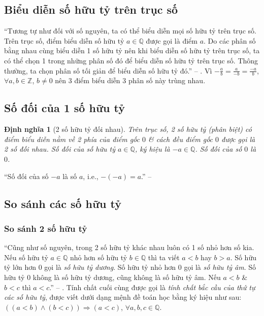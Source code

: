 \documentclass[oneside]{book}
\numberwithin{equation}{section}
\newtheorem{dinhnghia}{Định nghĩa}[section]
\begin{document}
\subsection{Biểu diễn số hữu tỷ trên trục số}
``Tương tự như đối với số nguyên, ta có thể biểu diễn mọi số hữu tỷ trên trục số. Trên trục số, điểm biểu diễn số hữu tỷ $a\in\mathbb{Q}$ được gọi là điểm $a$. Do các phân số bằng nhau cùng biểu diễn 1 số hữu tỷ nên khi biểu diễn số hữu tỷ trên trục số, ta có thể chọn 1 trong những phân số đó để biểu diễn số hữu tỷ trên trục số. Thông thường, ta chọn phân số tối giản để biểu diễn số hữu tỷ đó.'' -- \cite[p. 6]{SGK_Toan_7_Canh_Dieu_tap_1}. Vì $-\frac{a}{b} = \frac{a}{-b} = \frac{-a}{b}$, $\forall a,b\in\mathbb{Z}$, $b\ne 0$ nên 3 điểm biểu diễn 3 phân số này trùng nhau.

\subsection{Số đối của 1 số hữu tỷ}

\begin{dinhnghia}[2 số hữu tỷ đối nhau]
	Trên trục số, 2 số hữu tỷ (phân biệt) có điểm biểu diễn nằm về 2 phía của điểm gốc $0$ \& cách đều điểm gốc $0$ được gọi là \emph{2 số đối nhau}. Số đối của số hữu tỷ $a\in\mathbb{Q}$, ký hiệu là $-a\in\mathbb{Q}$. Số đối của số $0$ là $0$.
\end{dinhnghia}
``Số đối của số $-a$ là số $a$, i.e., $-(-a) = a$.'' -- \cite[p. 8]{SGK_Toan_7_Canh_Dieu_tap_1}

\subsection{So sánh các số hữu tỷ}

\subsubsection{So sánh 2 số hữu tỷ}
``Cũng như số nguyên, trong 2 số hữu tỷ khác nhau luôn có 1 số nhỏ hơn số kia. Nếu số hữu tỷ $a\in\mathbb{Q}$ nhỏ hơn số hữu tỷ $b\in\mathbb{Q}$ thì ta viết $a < b$ hay $b > a$. Số hữu tỷ lớn hơn $0$ gọi là \emph{số hữu tỷ dương}. Số hữu tỷ nhỏ hơn $0$ gọi là \emph{số hữu tỷ âm}. Số hữu tỷ $0$ không là số hữu tỷ dương, cũng không là số hữu tỷ âm. Nếu $a < b$ \& $b < c$ thì $a < c$.'' -- \cite[p. 8]{SGK_Toan_7_Canh_Dieu_tap_1}. Tính chất cuối cùng được gọi là \textit{tính chất bắc cầu của thứ tự các số hữu tỷ}, được viết dưới dạng mệnh đề toán học bằng ký hiệu như sau: $((a < b)\land(b < c))\Rightarrow(a < c)$, $\forall a,b,c\in\mathbb{Q}$.
\end{document}
